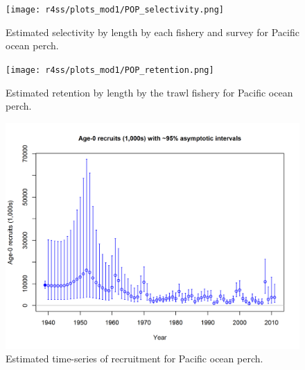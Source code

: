 \documentclass[12pt,]{article}
\begin{document}
\FloatBarrier 

\begin{figure}
\centering
\texttt{[image: r4ss/plots\_mod1/POP\_selectivity.png]}
\caption{Estimated selectivity by length by each fishery and survey for
Pacific ocean perch. \label{fig:selex}}
\end{figure}

\FloatBarrier 

\begin{figure}
\centering
\texttt{[image: r4ss/plots\_mod1/POP\_retention.png]}
\caption{Estimated retention by length by the trawl fishery for Pacific
ocean perch. \label{fig:retention}}
\end{figure}

\FloatBarrier 

\begin{figure}
\centering
\includegraphics{r4ss/plots_mod1/ts11_Age-0_recruits_(1000s)_with_95_asymptotic_intervals.png}
\caption{Estimated time-series of recruitment for Pacific ocean perch.
\label{fig:recruits}}
\end{figure}

\FloatBarrier
\end{document}
